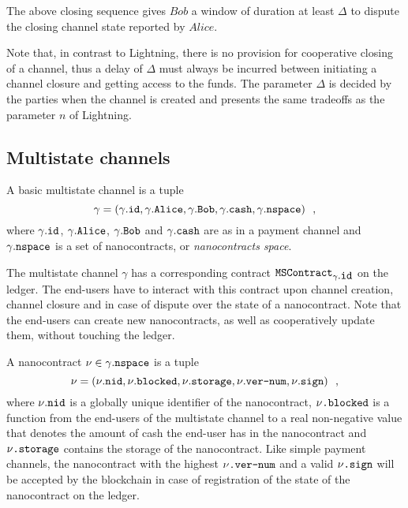     The above closing sequence gives $Bob$ a window of duration at least $\Delta$ to
    dispute the closing channel state reported by $Alice$.

    Note that, in contrast to Lightning, there is no provision for cooperative closing of
    a channel, thus a delay of $\Delta$ must always be incurred between initiating a
    channel closure and getting access to the funds. The parameter $\Delta$ is decided by
    the parties when the channel is created and presents the same tradeoffs as the
    parameter $n$ of Lightning.

  \subsection{Multistate channels}
    A basic multistate channel is a tuple
    \begin{equation*}
      \gamma = \left(\gamma\mbox{.\texttt{id}}, \gamma\mbox{.\texttt{Alice}},
      \gamma\mbox{.\texttt{Bob}}, \gamma\mbox{.\texttt{cash}},
      \gamma\mbox{.\texttt{nspace}}\right) \enspace,
    \end{equation*}
    where $\gamma\mbox{.\texttt{id}}$, $\gamma\mbox{.\texttt{Alice}}$,
    $\gamma\mbox{.\texttt{Bob}}$ and $\gamma\mbox{.\texttt{cash}}$ are as in a payment
    channel and $\gamma\mbox{.\texttt{nspace}}$ is a set of nanocontracts, or
    \textit{nanocontracts space}.

    The multistate channel $\gamma$ has a corresponding contract
    $\mbox{\texttt{MSContract}}_{\gamma\mbox{.\texttt{id}}}$ on the ledger. The end-users
    have to interact with this contract upon channel creation, channel closure and in case
    of dispute over the state of a nanocontract. Note that the end-users can create new
    nanocontracts, as well as cooperatively update them, without touching the ledger.

    A nanocontract $\nu \in \gamma\mbox{.\texttt{nspace}}$ is a tuple
    \begin{equation*}
      \nu = \left(\nu\mbox{.\texttt{nid}}, \nu\mbox{.\texttt{blocked}},
      \nu\mbox{.\texttt{storage}}, \nu\mbox{.\texttt{ver-num}},
      \nu\mbox{.\texttt{sign}}\right) \enspace,
    \end{equation*}
    where $\nu\mbox{.\texttt{nid}}$ is a globally unique identifier of the nanocontract,
    $\nu\mbox{\texttt{.blocked}}$ is a function from the end-users of the multistate
    channel to a real non-negative value that denotes the amount of cash the end-user has
    in the nanocontract and $\nu\mbox{\texttt{.storage}}$ contains the storage of the
    nanocontract. Like simple payment channels, the nanocontract with the highest
    $\nu\mbox{\texttt{.ver-num}}$ and a valid $\nu\mbox{\texttt{.sign}}$ will be accepted
    by the blockchain in case of registration of the state of the nanocontract on the
    ledger.

